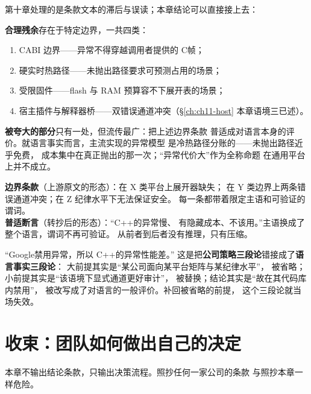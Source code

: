 \documentclass[12pt,a4paper,fontset=fandol]{ctexbook}
\newcommand{\Lang}[1]{\textsf{#1}}
\newcommand{\CL}{\Lang{C}}
\newcommand{\CPP}{\Lang{C++}}
\newcommand{\DomGo}{\Lang{Google}}
\begin{document}
第十章处理的是条款文本的滞后与误读；本章结论可以直接接上去：

\textbf{合理残余}存在于特定边界，一共四类：
\begin{enumerate}[label=(\arabic*)]
\item \CL ABI 边界——异常不得穿越调用者提供的 \CL 帧；
\item 硬实时热路径——未抛出路径要求可预测占用的场景；
\item 受限固件——flash 与 RAM 预算容不下展开表的场景；
\item 宿主插件与解释器桥——双错误通道冲突（\S\ref{ch:ch11-host}
本章语境三已述）。
\end{enumerate}

\textbf{被夸大的部分}只有一处，但流传最广：把上述边界条款
普适成对语言本身的评价。就语言事实而言，主流实现的异常模型
是冷热路径分账的——未抛出路径近乎免费，
成本集中在真正抛出的那一次；``异常代价大''作为全称命题
在通用平台上并不成立。

\begin{compare}[title={边界条款与普适断言的形态差异}]
\textbf{边界条款}（上游原文的形态）：在 X 类平台上展开器缺失；
在 Y 类边界上两条错误通道冲突；在 Z 纪律水平下无法保证安全。
每一条都带着限定主语和可验证的谓词。\\[2pt]
\textbf{普适断言}（转抄后的形态）：``\CPP 的异常慢、
有隐藏成本、不该用。''主语换成了整个语言，谓词不再可验证。
从前者到后者没有推理，只有压缩。
\end{compare}

\begin{warning}[title={转抄变形最典型的一句话}]
``\DomGo 禁用异常，所以 \CPP 的异常性能差。''
这是把\textbf{公司策略三段论}错接成了\textbf{语言事实三段论}：
大前提其实是``某公司面向某平台矩阵与某纪律水平''，
被省略；小前提其实是``该语境下显式通道更好审计''，
被替换；结论其实是``故在其代码库内禁用''，
被改写成了对语言的一般评价。补回被省略的前提，
这个三段论就当场失效。
\end{warning}

\section{收束：团队如何做出自己的决定}
\label{sec:ch11-decision}

本章不输出结论条款，只输出决策流程。照抄任何一家公司的条款
与照抄本章一样危险。
\end{document}
